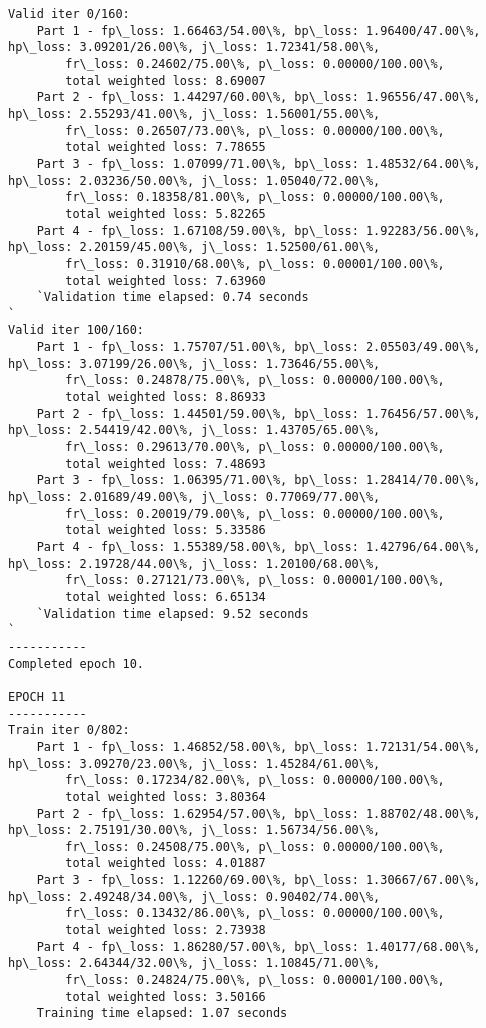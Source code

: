 \documentclass[11pt]{article}
\begin{document}
\begin{Verbatim}[commandchars=\\\{\}]
Valid iter 0/160:
	Part 1 - fp\_loss: 1.66463/54.00\%, bp\_loss: 1.96400/47.00\%, hp\_loss: 3.09201/26.00\%, j\_loss: 1.72341/58.00\%, 
		fr\_loss: 0.24602/75.00\%, p\_loss: 0.00000/100.00\%, 
		total weighted loss: 8.69007
	Part 2 - fp\_loss: 1.44297/60.00\%, bp\_loss: 1.96556/47.00\%, hp\_loss: 2.55293/41.00\%, j\_loss: 1.56001/55.00\%, 
		fr\_loss: 0.26507/73.00\%, p\_loss: 0.00000/100.00\%, 
		total weighted loss: 7.78655
	Part 3 - fp\_loss: 1.07099/71.00\%, bp\_loss: 1.48532/64.00\%, hp\_loss: 2.03236/50.00\%, j\_loss: 1.05040/72.00\%, 
		fr\_loss: 0.18358/81.00\%, p\_loss: 0.00000/100.00\%, 
		total weighted loss: 5.82265
	Part 4 - fp\_loss: 1.67108/59.00\%, bp\_loss: 1.92283/56.00\%, hp\_loss: 2.20159/45.00\%, j\_loss: 1.52500/61.00\%, 
		fr\_loss: 0.31910/68.00\%, p\_loss: 0.00001/100.00\%, 
		total weighted loss: 7.63960
	`Validation time elapsed: 0.74 seconds
`
Valid iter 100/160:
	Part 1 - fp\_loss: 1.75707/51.00\%, bp\_loss: 2.05503/49.00\%, hp\_loss: 3.07199/26.00\%, j\_loss: 1.73646/55.00\%, 
		fr\_loss: 0.24878/75.00\%, p\_loss: 0.00000/100.00\%, 
		total weighted loss: 8.86933
	Part 2 - fp\_loss: 1.44501/59.00\%, bp\_loss: 1.76456/57.00\%, hp\_loss: 2.54419/42.00\%, j\_loss: 1.43705/65.00\%, 
		fr\_loss: 0.29613/70.00\%, p\_loss: 0.00000/100.00\%, 
		total weighted loss: 7.48693
	Part 3 - fp\_loss: 1.06395/71.00\%, bp\_loss: 1.28414/70.00\%, hp\_loss: 2.01689/49.00\%, j\_loss: 0.77069/77.00\%, 
		fr\_loss: 0.20019/79.00\%, p\_loss: 0.00000/100.00\%, 
		total weighted loss: 5.33586
	Part 4 - fp\_loss: 1.55389/58.00\%, bp\_loss: 1.42796/64.00\%, hp\_loss: 2.19728/44.00\%, j\_loss: 1.20100/68.00\%, 
		fr\_loss: 0.27121/73.00\%, p\_loss: 0.00001/100.00\%, 
		total weighted loss: 6.65134
	`Validation time elapsed: 9.52 seconds
`
-----------
Completed epoch 10.

EPOCH 11
-----------
Train iter 0/802:
	Part 1 - fp\_loss: 1.46852/58.00\%, bp\_loss: 1.72131/54.00\%, hp\_loss: 3.09270/23.00\%, j\_loss: 1.45284/61.00\%, 
		fr\_loss: 0.17234/82.00\%, p\_loss: 0.00000/100.00\%, 
		total weighted loss: 3.80364
	Part 2 - fp\_loss: 1.62954/57.00\%, bp\_loss: 1.88702/48.00\%, hp\_loss: 2.75191/30.00\%, j\_loss: 1.56734/56.00\%, 
		fr\_loss: 0.24508/75.00\%, p\_loss: 0.00000/100.00\%, 
		total weighted loss: 4.01887
	Part 3 - fp\_loss: 1.12260/69.00\%, bp\_loss: 1.30667/67.00\%, hp\_loss: 2.49248/34.00\%, j\_loss: 0.90402/74.00\%, 
		fr\_loss: 0.13432/86.00\%, p\_loss: 0.00000/100.00\%, 
		total weighted loss: 2.73938
	Part 4 - fp\_loss: 1.86280/57.00\%, bp\_loss: 1.40177/68.00\%, hp\_loss: 2.64344/32.00\%, j\_loss: 1.10845/71.00\%, 
		fr\_loss: 0.24824/75.00\%, p\_loss: 0.00001/100.00\%, 
		total weighted loss: 3.50166
	Training time elapsed: 1.07 seconds


\end{Verbatim}
\end{document}
